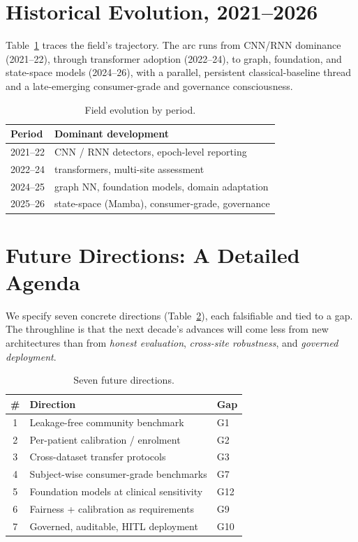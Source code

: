 \section{Historical Evolution, 2021--2026}
Table~\ref{tab:hist} traces the field's trajectory. The arc runs from CNN/RNN dominance (2021--22), through transformer adoption (2022--24), to graph, foundation, and state-space models (2024--26), with a parallel, persistent classical-baseline thread and a late-emerging consumer-grade and governance consciousness.
\begin{table}[h]\centering\caption{Field evolution by period.}\label{tab:hist}
\footnotesize\begin{tabular}{ll}\toprule
Period & Dominant development\\\midrule
2021--22 & CNN / RNN detectors, epoch-level reporting\\
2022--24 & transformers, multi-site assessment\\
2024--25 & graph NN, foundation models, domain adaptation\\
2025--26 & state-space (Mamba), consumer-grade, governance\\\bottomrule
\end{tabular}\end{table}

\section{Future Directions: A Detailed Agenda}
We specify seven concrete directions (Table~\ref{tab:future}), each falsifiable and tied to a gap. The throughline is that the next decade's advances will come less from new architectures than from \emph{honest evaluation}, \emph{cross-site robustness}, and \emph{governed deployment}.
\begin{table}[h]\centering\caption{Seven future directions.}\label{tab:future}
\footnotesize\begin{tabular}{cll}\toprule
\# & Direction & Gap\\\midrule
1 & Leakage-free community benchmark & G1\\
2 & Per-patient calibration / enrolment & G2\\
3 & Cross-dataset transfer protocols & G3\\
4 & Subject-wise consumer-grade benchmarks & G7\\
5 & Foundation models at clinical sensitivity & G12\\
6 & Fairness + calibration as requirements & G9\\
7 & Governed, auditable, HITL deployment & G10\\\bottomrule
\end{tabular}\end{table}


